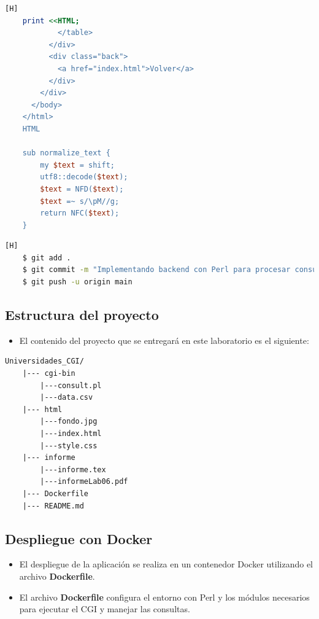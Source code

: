 \documentclass{article}
\begin{document}
\begin{lstlisting}[language=perl,caption={Código en Perl para consulta de universidades licenciadas}][H]
    print <<HTML;
            </table>
          </div>
          <div class="back">
            <a href="index.html">Volver</a>
          </div>
        </div>
      </body>
    </html>
    HTML
    
    sub normalize_text {
        my $text = shift;
        utf8::decode($text);
        $text = NFD($text);
        $text =~ s/\pM//g;
        return NFC($text);
    }
    \end{lstlisting}
    
    \begin{lstlisting}[language=bash,caption={Commit: Implementando backend con Perl para procesar consultas}][H]
    $ git add .
    $ git commit -m "Implementando backend con Perl para procesar consultas sobre universidades"
    $ git push -u origin main
    \end{lstlisting}
    
    \subsection{Estructura del proyecto} 
    \begin{itemize} 
        \item El contenido del proyecto que se entregará en este laboratorio es el siguiente:
    \end{itemize}
    
    \begin{lstlisting}[style=ascii-tree]
    Universidades_CGI/
    |--- cgi-bin
        |---consult.pl
        |---data.csv
    |--- html
        |---fondo.jpg
        |---index.html
        |---style.css
    |--- informe
        |---informe.tex
        |---informeLab06.pdf
    |--- Dockerfile
    |--- README.md
    \end{lstlisting}
    
    \subsection{Despliegue con Docker}
    \begin{itemize}
        \item El despliegue de la aplicación se realiza en un contenedor Docker utilizando el archivo \textbf{Dockerfile}.
        \item El archivo \textbf{Dockerfile} configura el entorno con Perl y los módulos necesarios para ejecutar el CGI y manejar las consultas.
    \end{itemize}
    
\end{document}
